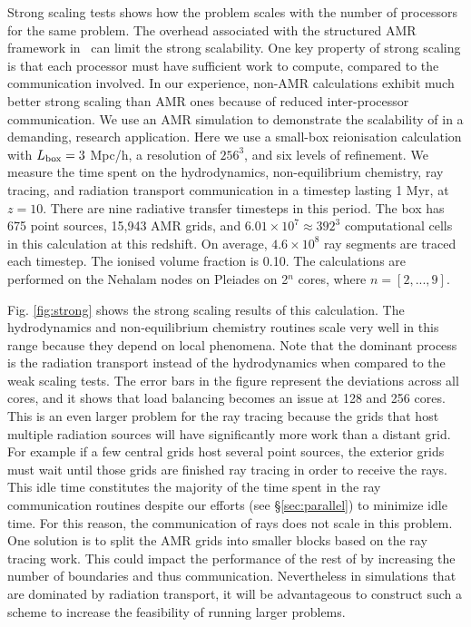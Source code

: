 \documentclass[useAMS,usenatbib]{mn2e}
\begin{document}
Strong scaling tests shows how the problem scales with the number of
processors for the same problem.  The overhead associated with the
structured AMR framework in \enzo~can limit the strong scalability.
One key property of strong scaling is that each processor must have
sufficient work to compute, compared to the communication involved.
In our experience, non-AMR calculations exhibit much better strong
scaling than AMR ones because of reduced inter-processor
communication.  We use an AMR simulation to demonstrate the scalability
of \moray in a demanding, research application.  Here we use a
small-box reionisation calculation with $L_{\rm box} = 3$ Mpc/h, a
resolution of $256^3$, and six levels of refinement.  We measure the
time spent on the hydrodynamics, non-equilibrium chemistry, ray
tracing, and radiation transport communication in a timestep lasting 1
Myr, at $z=10$.  There are nine radiative transfer timesteps in this
period.  The box has 675 point sources, 15,943 AMR grids, and $6.01
\times 10^7 \approx 392^3$ computational cells in this calculation at
this redshift.  On average, $4.6 \times 10^8$ ray segments are traced
each timestep.  The ionised volume fraction is 0.10.  The calculations
are performed on the Nehalam nodes on Pleiades on 2$^n$ cores, where
$n = [2,...,9]$.

Fig. \ref{fig:strong} shows the strong scaling results of this
calculation.  The hydrodynamics and non-equilibrium chemistry routines
scale very well in this range because they depend on local phenomena.
Note that the dominant process is the radiation transport instead of
the hydrodynamics when compared to the weak scaling tests.  The error
bars in the figure represent the deviations across all cores, and it
shows that load balancing becomes an issue at 128 and 256 cores.  This
is an even larger problem for the ray tracing because the grids that
host multiple radiation sources will have significantly more work than
a distant grid.  For example if a few central grids host several point
sources, the exterior grids must wait until those grids are finished
ray tracing in order to receive the rays.  This idle time constitutes
the majority of the time spent in the ray communication routines
despite our efforts (see \S\ref{sec:parallel}) to minimize idle time.
For this reason, the communication of rays does not scale in this
problem.  One solution is to split the AMR grids into smaller blocks
based on the ray tracing work.  This could impact the performance of
the rest of \enzo by increasing the number of boundaries and thus
communication.  Nevertheless in simulations that are dominated by
radiation transport, it will be advantageous to construct such a
scheme to increase the feasibility of running larger problems.
\end{document}
